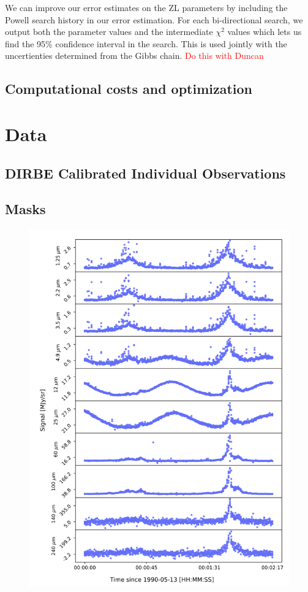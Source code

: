 \documentclass[twocolumn]{aa}
\begin{document}
We can improve our error estimates on the ZL parameters by including the 
Powell search history in our error estimation. For each bi-directional 
search, we output both the parameter values and the intermediate $\chi^2$
values which lets us find the 95\% confidence interval in the search. This
is used jointly with the uncertienties determined from the Gibbs chain.
\textcolor{red}{Do this with Duncan}




\subsection{Computational costs and optimization}



\section{Data}\label{sect:data}

\subsection{DIRBE Calibrated Individual Observations}

\subsection{Masks}


\begin{figure}
    \centering
    \includegraphics[width=\columnwidth]{figs/tod_zodi.pdf}
    \caption{}
    \label{fig:tod_zodi}
\end{figure}
\end{document}
